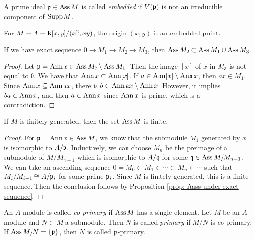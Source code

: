         \begin{definition}\label{def: embedded prime}
            A prime ideal ${\mathfrak{p}} \in \operatorname{Ass} M$ is called \textit{embedded} if $V({\mathfrak{p}})$ is not an irreducible component of $\operatorname{Supp} M$.
        \end{definition}

        \begin{example}
            For $M = A = {\mathbf{k}}[x,y]/(x^2,xy)$, the origin $(x,y)$ is an embedded point.
        \end{example}

        \begin{proposition}\label{prop: Aass under exact sequence}
            If we have exact sequence $0 \to M_1 \to M_2 \to M_3$, then $\operatorname{Ass} M_2 \subset \operatorname{Ass} M_1 \cup \operatorname{Ass} M_3$.
        \end{proposition}
        \begin{proof}
            Let ${\mathfrak{p}} = \operatorname{Ann} x \in \operatorname{Ass} M_2 \setminus \operatorname{Ass} M_1$.
            Then the image $[x]$ of $x$ in $M_3$ is not equal to $0$.
            We have that $\operatorname{Ann} x \subset \operatorname{Ann} [x]$.
            If $a \in \operatorname{Ann} [x] \setminus \operatorname{Ann} x$, then $ax \in M_1$.
            Since $\operatorname{Ann} x \subsetneq \operatorname{Ann} ax$, there is $b \in \operatorname{Ann} ax \setminus \operatorname{Ann} x$.
            However, it implies $ba \in \operatorname{Ann} x$, and then $a \in \operatorname{Ann} x$ since $\operatorname{Ann} x$ is prime, which is a contradiction.
        \end{proof}

        \begin{corollary}\label{cor: Ass is finite}
            If $M$ is finitely generated, then the set $\operatorname{Ass} M$ is finite.
        \end{corollary}
        \begin{proof}
            For ${\mathfrak{p}} = \operatorname{Ann} x \in \operatorname{Ass} M$, we know that the submodule $M_1$ generated by $x$ is isomorphic to $A/{\mathfrak{p}}$.
            Inductively, we can choose $M_n$ be the preimage of a submodule of $M/M_{n-1}$ which is isomorphic to $A/{\mathfrak{q}}$ for some ${\mathfrak{q}} \in \operatorname{Ass} M/M_{n-1}$.
            We can take an ascending sequence $0 = M_0 \subset M_1 \subset \cdots \subset M_n \subset \cdots$ such that $M_i/M_{i-1} \cong A/{\mathfrak{p}}_i$ for some prime ${\mathfrak{p}}_i$.
            Since $M$ is finitely generated, this is a finite sequence.
            Then the conclusion follows by Proposition \ref{prop: Aass under exact sequence}.
        \end{proof}

        \begin{definition}\label{def: co-primary and primary}
            An $A$-module is called \textit{co-primary} if $\operatorname{Ass} M$ has a single element.
            Let $M$ be an $A$-module and $N \subset M$ a submodule.
            Then $N$ is called \textit{primary} if $M/N$ is co-primary.
            If $\operatorname{Ass} M/N = \{{\mathfrak{p}}\}$, then $N$ is called ${\mathfrak{p}}$-primary.
        \end{definition}

